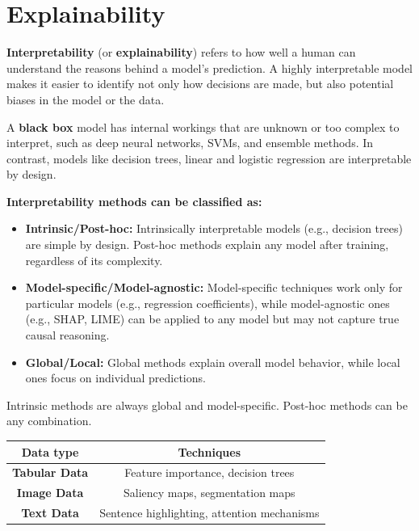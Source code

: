 \section{Explainability}
\textbf{Interpretability} (or \textbf{explainability}) refers to how well a human can understand the reasons behind a model's prediction. A highly interpretable model makes it easier to identify not only how decisions are made, but also potential biases in the model or the data.

A \textbf{black box} model has internal workings that are unknown or too complex to interpret, such as deep neural networks, SVMs, and ensemble methods. In contrast, models like decision trees, linear and logistic regression are interpretable by design.

\vspace{0.3cm}
\noindent
\textbf{Interpretability methods can be classified as:}
\begin{itemize}
    \item \textbf{Intrinsic/Post-hoc:}  
    Intrinsically interpretable models (e.g., decision trees) are simple by design. Post-hoc methods explain any model after training, regardless of its complexity.
    \item \textbf{Model-specific/Model-agnostic:}  
    Model-specific techniques work only for particular models (e.g., regression coefficients), while model-agnostic ones (e.g., SHAP, LIME) can be applied to any model but may not capture true causal reasoning.
    \item \textbf{Global/Local:}  
    Global methods explain overall model behavior, while local ones focus on individual predictions.
\end{itemize}

Intrinsic methods are always global and model-specific. Post-hoc methods can be any combination.

\begin{table}[H]
    \centering
    \begin{tabular}{|c|c|}
    \hline
        \textbf{Data type} & \textbf{Techniques} \\
        \hline
        \textbf{Tabular Data} & Feature importance, decision trees \\
        \hline
        \textbf{Image Data} & Saliency maps, segmentation maps \\
        \hline
        \textbf{Text Data} & Sentence highlighting, attention mechanisms \\
        \hline
    \end{tabular}
\end{table}

